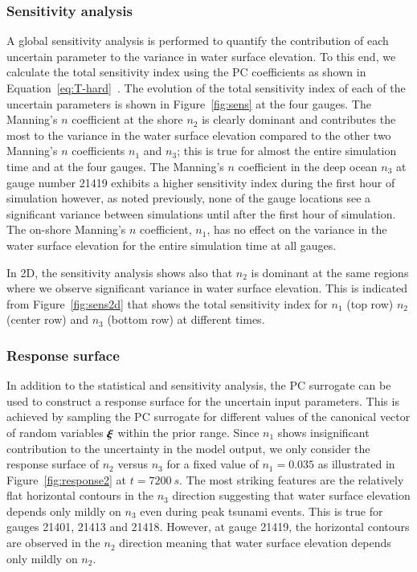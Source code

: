 \documentclass[review,12pt]{elsarticle}
\newcommand{\xxi}{\vec{\xi}}
\renewcommand{\vec}[1]{{\mathchoice
                     {\mbox{\boldmath$\displaystyle{#1}$}}
                     {\mbox{\boldmath$\textstyle{#1}$}}
                     {\mbox{\boldmath$\scriptstyle{#1}$}}
                     {\mbox{\boldmath$\scriptscriptstyle{#1}$}}}}
\begin{document}
\subsubsection{Sensitivity analysis}
A global sensitivity analysis is performed to quantify the contribution of each
uncertain parameter to the variance in water surface elevation. To this end, we calculate 
the total sensitivity index using the PC coefficients as shown in Equation~\eqref{eq:T-hard}~\citep{Alexanderian2012,Sudret,Crestaux}. The evolution of the total sensitivity index
of each of the uncertain parameters is shown in Figure~\ref{fig:sens} at the four gauges. 
The Manning's $n$ coefficient at the shore $n_2$ is clearly dominant and contributes
the most to the variance in the water surface elevation compared to the other two 
Manning's $n$ coefficients $n_1$ and $n_3$; this is true for almost the entire simulation time
and at the four gauges. The Manning's $n$ coefficient in the deep ocean $n_{3}$ at gauge number 21419 exhibits a higher sensitivity index during the first hour of simulation however, as noted previously, none of the gauge locations see a significant variance between simulations until after the first hour of simulation.
The on-shore Manning's $n$ coefficient, $n_{1 }$, has no effect on the variance in
the water surface elevation for the entire simulation time at all gauges.

In 2D, the sensitivity analysis shows also that $n_2$ is dominant
at the same regions where we observe significant variance in water surface elevation. This is
indicated from Figure~\ref{fig:sens2d} that shows the total sensitivity index
for $n_1$ (top row) $n_2$ (center row) and $n_3$ (bottom row)
at different times.

\subsubsection{Response surface}
In addition to the statistical and sensitivity analysis, the PC surrogate 
can be used to construct a response surface for the uncertain input parameters.
This is achieved by sampling the PC surrogate for different values of the 
canonical vector of random variables  $\xxi$ within the prior
range. Since $n_1$ shows insignificant contribution to the 
uncertainty in the model output, we only consider the response surface
of $n_2$ versus $n_3$ for a fixed value of $n_1=0.035$ as illustrated in Figure~\ref{fig:response2}
at $t=7200~s$. The most striking features are the relatively flat
horizontal contours in the $n_3$ direction suggesting that water surface elevation depends
only mildly on $n_3$ even during peak tsunami events. This is true for gauges 21401, 21413 and 21418. However,
at gauge 21419, the horizontal contours are observed in the $n_2 $ direction
meaning that water surface elevation depends only mildly on $n_2$.
\end{document}
